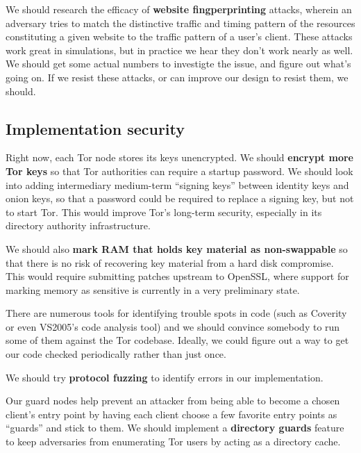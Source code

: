 \documentclass{article}
\newcommand{\tmp}[1]{{\bf #1} [......] \\}
\begin{document}
%

We should research the efficacy of {\bf website fingperprinting} attacks,
wherein an adversary tries to match the distinctive traffic and timing
pattern of the resources constituting a given website to the traffic pattern
of a user's client.  These attacks work great in simulations, but in
practice we hear they don't work nearly as well.  We should get some actual
numbers to investigte the issue, and figure out what's going on.  If we
resist these attacks, or can improve our design to resist them, we should.

\subsection{Implementation security}
Right now, each Tor node stores its keys unencrypted.  We should {\bf encrypt
  more Tor keys} so that Tor authorities can require a startup password.  We
should look into adding intermediary medium-term ``signing keys'' between
identity keys and onion keys, so that a password could be required to replace
a signing key, but not to start Tor.  This would improve Tor's long-term
security, especially in its directory authority infrastructure.

We should also {\bf mark RAM that holds key material as non-swappable} so
that there is no risk of recovering key material from a hard disk
compromise.  This would require submitting patches upstream to OpenSSL, where
support for marking memory as sensitive is currently in a very preliminary
state.

There are numerous tools for identifying trouble spots in code (such as
Coverity or even VS2005's code analysis tool) and we should convince somebody
to run some of them against the Tor codebase.  Ideally, we could figure out a
way to get our code checked periodically rather than just once.

We should try {\bf protocol fuzzing} to identify errors in our
implementation.

Our guard nodes help prevent an attacker from being able to become a chosen
client's entry point by having each client choose a few favorite entry points
as ``guards'' and stick to them.   We should implement a {\bf directory
  guards} feature to keep adversaries from enumerating Tor users by acting as
a directory cache.
\end{document}
